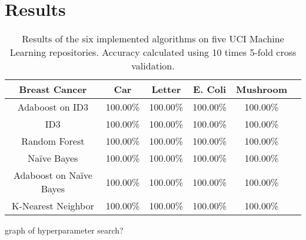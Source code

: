 \documentclass[11pt]{article}
\begin{document}
\section{Results}
\begin{table}
  \begin{tabular}{ |c|c|c|c|c|c| }
    \hline
    Breast Cancer           & Car      & Letter   & E. Coli  & Mushroom \\ \hline
    Adaboost on ID3         & 100.00\% & 100.00\% & 100.00\% & 100.00\% \\ \hline
    ID3                     & 100.00\% & 100.00\% & 100.00\% & 100.00\% \\ \hline
    Random Forest           & 100.00\% & 100.00\% & 100.00\% & 100.00\% \\ \hline
    Naïve Bayes             & 100.00\% & 100.00\% & 100.00\% & 100.00\% \\ \hline
    Adaboost on Naïve Bayes & 100.00\% & 100.00\% & 100.00\% & 100.00\% \\ \hline
    K-Nearest Neighbor      & 100.00\% & 100.00\% & 100.00\% & 100.00\% \\ \hline
  \end{tabular}
  \caption{Results of the six implemented algorithms on five UCI Machine Learning repositories. Accuracy calculated using 10 times 5-fold cross validation.}
\end{table}

graph of hyperparameter search?



\end{document}
